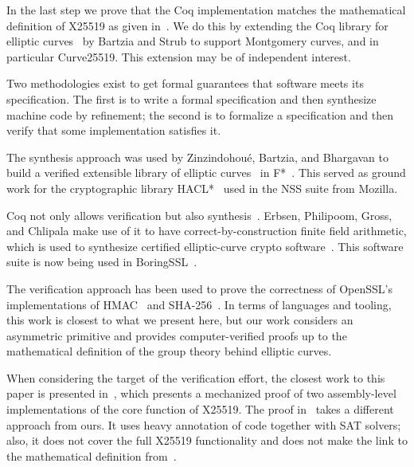 In the last step we prove that the Coq implementation matches
the mathematical definition of X25519 as given in~\cite[Sec.~2]{Ber06}.
We do this by extending the Coq library
for elliptic curves~\cite{BartziaS14} by Bartzia and Strub to
support Montgomery curves, and in particular Curve25519.
This extension may be of independent interest.

Two methodologies exist to get formal guarantees that software meets its specification.
The first is to write a formal specification and then synthesize
machine code by refinement; the second is to formalize
a specification and then verify that some
implementation satisfies it.

The synthesis approach was used by Zinzindohou{\'{e}}, Bartzia, and Bhargavan to build a verified extensible
library of elliptic curves~\cite{Zinzindohoue2016AVE} in F*~\cite{DBLP:journals/corr/BhargavanDFHPRR17}.
This served as ground work for the cryptographic library HACL*~\cite{zinzindohoue2017hacl}
used in the NSS suite from Mozilla.

Coq not only allows verification but also synthesis~\cite{CpdtJFR}.
Erbsen, Philipoom, Gross, and Chlipala make use of it to have
correct-by-construction finite field arithmetic, which is used
to synthesize certified elliptic-curve crypto software~\cite{Philipoom2018CorrectbyconstructionFF,Erbsen2017CraftingCE,Erbsen2016SystematicSO}.
This software suite is now being used in BoringSSL~\cite{fiat-crypto}.

The verification approach has been used to prove the correctness of OpenSSL's
implementations of HMAC~\cite{Beringer2015VerifiedCA} and SHA-256~\cite{2015-Appel}.
In terms of languages and tooling, this work is closest to what we present here,
but our work considers an asymmetric primitive and provides computer-verified
proofs up to the mathematical definition of the group theory behind elliptic curves.

When considering the target of the verification effort, the closest work
to this paper is presented in~\cite{Chen2014VerifyingCS}, which presents
a mechanized proof of two assembly-level implementations of the core function of X25519.
The proof in~\cite{Chen2014VerifyingCS} takes a different approach from ours.
It uses heavy annotation of code together with SAT solvers;
also, it does not cover the full X25519 functionality and does
not make the link to the mathematical definition from~\cite{Ber06}.

